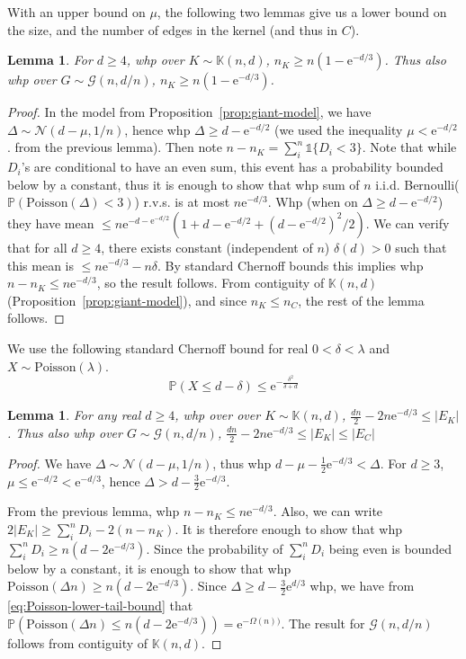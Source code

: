 \documentclass[11pt]{article}
\theoremstyle{plain}
\newtheorem{lemma}[theorem]{Lemma}
\newcommand{\G}{\mathcal{G}}
\newcommand{\emm}{\mathrm{e}}
\newcommand{\Nc}{\mathcal{N}}
\renewcommand{\P}{\mathds{P}}
\newcommand{\1}{\mathbb{1}}
\newcommand{\Kb}{\mathbb{K}}
\newcommand{\Poisson}{\text{Poisson}}
\begin{document}
With an upper bound on \(\mu\), the following two lemmas give us a lower bound on the size, and the number of edges in the kernel (and thus in \(C\)).
\begin{lemma}\label{lem:lower-bound-on-kernel-size}
    For \(d\geq 4\), whp over \(K\sim\Kb(n,d)\), \(n_K\geq n(1-\emm^{-d/3})\). Thus also whp over \(G\sim\G(n,d/n)\), \(n_K \geq n(1-\emm^{-d/3})\).
\end{lemma}
\begin{proof}
    In the model from Proposition~\ref{prop:giant-model}, we have \(\Delta\sim\Nc(d-\mu,1/n)\), hence whp \(\Delta \geq d - \emm^{-d/2}\) (we used the inequality \(\mu < \emm^{-d/2}\). from the previous lemma). Then note \(n - n_K = \sum_i^n \1\{D_i < 3\}\). Note that while \(D_i\)'s are conditional to have an even sum, this event has a probability bounded below by a constant, thus it is enough to show that whp sum of \(n\) i.i.d. Bernoulli(\(\P(\Poisson(\Delta) < 3)\)) r.v.s. is at most \(n\emm^{-d/3}\).
    Whp (when on \(\Delta \geq d - \emm^{-d/2}\)) they have mean \(\leq n\emm^{-d-\emm^{-d/2}}(1 + d - \emm^{-d/2} + (d-\emm^{-d/2})^2/2)\). We can verify that for all \(d \geq 4\), there exists constant (independent of \(n\)) \(\delta(d) > 0\) such that this mean is \(\leq n \emm^{-d/3} - n\delta\). By standard Chernoff bounds this implies whp \(n - n_K \leq n\emm^{-d/3}\), so the result follows. From contiguity of \(\Kb(n,d)\) (Proposition~\ref{prop:giant-model}), and since \(n_K\leq n_C\), the rest of the lemma follows.
\end{proof}
We use the following standard Chernoff bound for real \(0<\delta<\lambda\) and \(X\sim\Poisson(\lambda)\).\begin{equation}
    \P(X \leq d - \delta) \leq \emm^{-\frac{\delta^2}{\delta+d}}\label{eq:Poisson-lower-tail-bound}
\end{equation}
\begin{lemma}\label{lem:bound-on-kernel-edges}
    For any real \(d \geq 4\), whp over over \(K\sim\Kb(n,d)\), \(\frac{dn}{2} - 2n\emm^{-d/3}\leq |E_K|\). Thus also whp over \(G\sim\G(n,d/n)\), \(\frac{dn}{2} - 2n\emm^{-d/3}\leq |E_K|\leq |E_C|\) \end{lemma}
\begin{proof}
    We have \(\Delta\sim\Nc(d-\mu,1/n)\), thus whp \(d - \mu - \tfrac 12\emm^{-d/3} < \Delta\). For \(d\geq 3\), \(\mu\leq \emm^{-d/2}<\emm^{-d/3}\), hence \(\Delta > d-\tfrac32 \emm^{-d/3}\). 




    From the previous lemma, whp \(n - n_K\leq n\emm^{-d/3}\). Also, we can write \(2|E_K| \geq \sum_i^n D_i - 2(n - n_K)\). It is therefore enough to show that whp \(\sum_i^n D_i \geq n(d - 2\emm^{-d/3})\). Since the probability of \(\sum_i^n D_i\) being even is bounded below by a constant, it is enough to show that whp \(\Poisson(\Delta n)\geq n(d-2\emm^{-d/3})\). Since  \(\Delta \geq d - \tfrac 32\emm^{d/3}\) whp, we have from \eqref{eq:Poisson-lower-tail-bound} that 
    $\P(\Poisson(\Delta n) \leq n(d-2\emm^{-d/3}))=\emm^{-\Omega(n))}$. 
    The result for \(\G(n,d/n)\) follows from contiguity of \(\Kb(n,d)\).
\end{proof}
\end{document}
